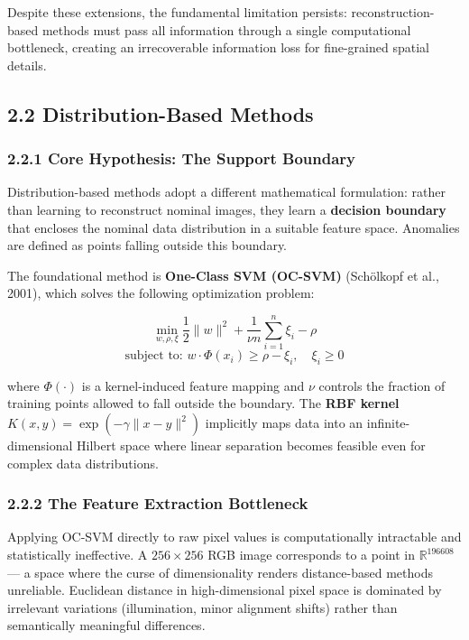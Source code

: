 \documentclass[12pt, a4paper, oneside]{report}
\begin{document}
Despite these extensions, the fundamental limitation persists: reconstruction-based methods must pass all information through a single computational bottleneck, creating an irrecoverable information loss for fine-grained spatial details.

\bigskip\noindent\hrulefill\bigskip

\subsection{2.2 Distribution-Based Methods}\label{distribution-based-methods}

\subsubsection{2.2.1 Core Hypothesis: The Support Boundary}\label{core-hypothesis-the-support-boundary}

Distribution-based methods adopt a different mathematical formulation: rather than learning to reconstruct nominal images, they learn a \textbf{decision boundary} that encloses the nominal data distribution in a suitable feature space. Anomalies are defined as points falling outside this boundary.

The foundational method is \textbf{One-Class SVM (OC-SVM)} (Schölkopf et al., 2001), which solves the following optimization problem:

\[\min_{w, \rho, \xi} \frac{1}{2} \|w\|^2 + \frac{1}{\nu n} \sum_{i=1}^{n} \xi_i - \rho\] \[\text{subject to: } w \cdot \Phi(x_i) \geq \rho - \xi_i, \quad \xi_i \geq 0\]

where \(\Phi(\cdot)\) is a kernel-induced feature mapping and \(\nu\) controls the fraction of training points allowed to fall outside the boundary. The \textbf{RBF kernel} \(K(x,y) = \exp(-\gamma \|x - y\|^2)\) implicitly maps data into an infinite-dimensional Hilbert space where linear separation becomes feasible even for complex data distributions.

\subsubsection{2.2.2 The Feature Extraction Bottleneck}\label{the-feature-extraction-bottleneck}

Applying OC-SVM directly to raw pixel values is computationally intractable and statistically ineffective. A \(256 \times 256\) RGB image corresponds to a point in \(\mathbb{R}^{196608}\) --- a space where the curse of dimensionality renders distance-based methods unreliable. Euclidean distance in high-dimensional pixel space is dominated by irrelevant variations (illumination, minor alignment shifts) rather than semantically meaningful differences.
\end{document}

